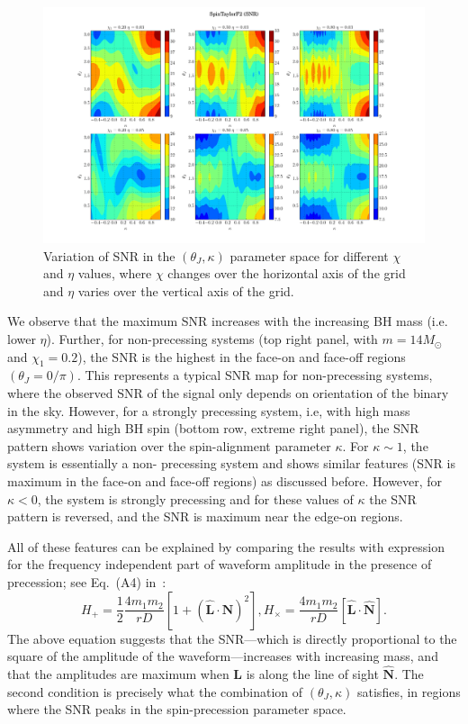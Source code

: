 \begin{figure}[t]
\includegraphics[width=\textwidth]{images/SNR_GRID_0F.pdf}
\caption{Variation of SNR in the $(\theta_J, \kappa)$ parameter space for 
different $\chi$ and $\eta$ values, where $\chi$ changes over the horizontal 
axis of the grid and $\eta$ varies over the vertical axis of the grid.}
\centering 
\label{fig:SNR} 
\end{figure}

We observe that the maximum SNR increases with the increasing BH mass (i.e.
lower $\eta$). Further, for non-precessing systems (top right panel, with
$m=14 M_\odot$ and $\chi_1=0.2$), the SNR is the highest in the face-on and
face-off regions $(\theta_{J} = 0/\pi)$. This represents a typical SNR map for
non-precessing systems, where the observed SNR of the signal only depends on
orientation of the binary in the sky. However, for a strongly precessing
system, i.e, with high mass asymmetry and high BH spin (bottom row, extreme
right panel), the SNR pattern shows variation over the spin-alignment
parameter $\kappa$. For $\kappa \sim 1$, the system is essentially a non-
precessing system and shows similar features (SNR is maximum in the face-on
and face-off regions) as discussed before. However, for $\kappa < 0$, the
system is strongly precessing and for these values of $\kappa$ the SNR pattern
is reversed, and the SNR is maximum near the edge-on regions.

All of these features can be explained by comparing the results with
expression for the frequency independent part of waveform amplitude in the
presence of precession; see Eq.~(A4) in~\cite{Apostolatos1994}:
\label{amplitudes}
\begin{equation}
H_{+} = \frac{1}{2}\frac{4 m_{1}m_{2}}{rD} \left[1 + (\hat{\mathbf{L}}\cdot\hat{\mathbf{N}})^{2}\right], 
H_{\times} = \frac{4 m_{1}m_{2}}{rD}\left[\hat{\mathbf{L}}\cdot\hat{\mathbf{N}}\right].
\end{equation}
The above equation suggests that the SNR---which is directly proportional to
the square of the  amplitude of the waveform---increases with increasing mass,
and that the amplitudes are maximum when $\mathbf{L}$ is along the line of
sight $\hat{\mathbf{N}}$. The second condition is precisely what the
combination of $(\theta_J, \kappa)$ satisfies, in regions where
the SNR peaks in the spin-precession parameter space.

